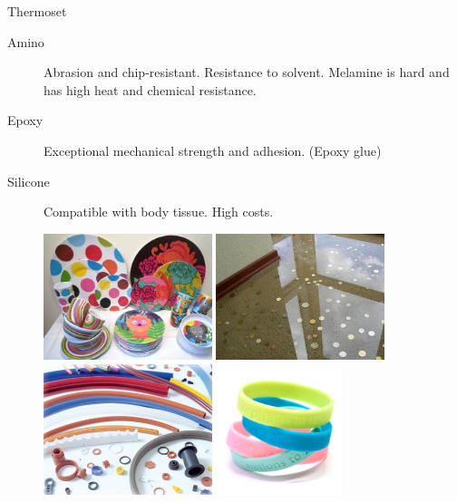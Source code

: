 \documentclass[10pt, svgnames]{beamer}
\begin{document}
\begin{frame}[label={sec:org5281fc4}]{Thermoset}
\begin{description}
\item[{Amino}] Abrasion and chip-resistant. Resistance to solvent. Melamine is hard and has high heat and chemical resistance.
\item[{Epoxy}] Exceptional mechanical strength and adhesion. (Epoxy glue)
\item[{Silicone}] Compatible with body tissue. High costs.

\centering
\includegraphics[width=0.4\textwidth]{pictures/melamine}
\includegraphics[width=0.4\textwidth]{pictures/epoxy}
\includegraphics[width=0.4\textwidth]{pictures/silicone}
\includegraphics[width=0.3\textwidth]{pictures/silicone2}
\end{description}
\end{frame}
\end{document}
